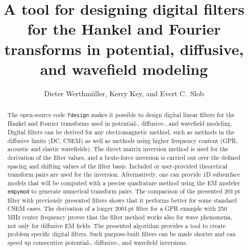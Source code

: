 \documentclass[paper,twocolumn,twoside]{geophysics}
\begin{document}
\title{A tool for designing digital filters for the Hankel and Fourier
transforms in potential, diffusive, and wavefield modeling}

\renewcommand{\thefootnote}{\fnsymbol{footnote}}


\address{
\footnotemark[1]Instituto Mexicano del Petróleo,
Eje Central Lázaro Cárdenas Norte 152,
Col. San Bartolo Atepehuacan C.P. 07730,
Ciudad de México, México,
E-mail: \href{mailto:dieter@werthmuller.org}{Dieter@Werthmuller.org};
\footnotemark[2]Lamont-Doherty Earth Observatory, Columbia University,
305C Oceanography,
61 Route 9W, PO Box 1000,
Palisades NY 10964-8000 US,
E-mail: \href{mailto:KKey@ldeo.columbia.edu}{KKey@ldeo.columbia.edu};
\footnotemark[3]TU Delft,
Building 23,
Stevinweg 1 / PO-box 5048,
2628 CN Delft,
E-mail: \href{mailto:E.C.Slob@tudelft.nl}{E.C.Slob@tudelft.nl}.}


\author{%
Dieter Werthmüller\footnotemark[1], %
Kerry Key\footnotemark[2], and %
Evert C.\ Slob\footnotemark[3]%
}

\footer{}

\maketitle

\begin{abstract} %
%
  The open-source code \texttt{fdesign} makes it possible to design digital
  linear filters for the Hankel and Fourier transforms used in potential-,
  diffusive-, and wavefield modeling. Digital filters can be derived for any
  electromagnetic method, such as methods in the diffusive limits (DC, CSEM) as
  well as methods using higher frequency content (GPR, acoustic and elastic
  wavefields).
%
  The direct matrix inversion method is used for the derivation of the filter
  values, and a brute-force inversion is carried out over the defined spacing
  and shifting values of the filter basis. Included or user-provided
  theoretical transform pairs are used for the inversion. Alternatively, one
  can provide 1D subsurface models that will be computed with a precise
  quadrature method using the EM modeler \texttt{empymod} to generate
  numerical transform pairs.
%
  The comparison of the presented 201\,pt filter with previously presented
  filters shows that it performs better for some standard CSEM cases. The
  derivation of a longer 2001\,pt filter for a GPR example with 250\,MHz center
  frequency proves that the filter method works also for wave phenomena, not
  only for diffusive EM fields.
%
  The presented algorithm provides a tool to create problem specific digital
  filters. Such purpose-built filters can be made shorter and can speed up
  consecutive  potential-, diffusive-, and wavefield inversions.
%
\end{abstract}
\end{document}
